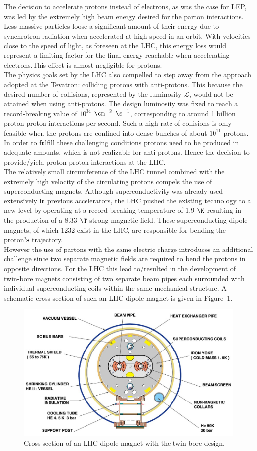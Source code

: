 The decision to accelerate protons instead of electrons, as was the case for LEP, was led by the extremely high beam energy desired for the parton interactions. Less massive particles loose a significant amount of their energy due to synchrotron radiation when accelerated at high speed in an orbit. With velocities close to the speed of light, as foreseen at the LHC, this energy loss would represent a limiting factor for the final energy reachable when accelerating electrons.This effect is almost negligible for protons.
\\
The physics goals set by the LHC also compelled to step away from the approach adopted at the Tevatron: colliding protons with anti-protons. This because the desired number of collisions, represented by the luminosity $\mathcal{L}$, would not be attained when using anti-protons. The design luminosity was fixed to reach a record-breaking value of $10^{34}$ $\cm^{-2}$ $\s^{-1}$, corresponding to around 1 billion proton-proton interactions per second. Such a high rate of collisions is only feasible when the protons are confined into dense bunches of about $10^{11}$ protons.
In order to fulfill these challenging conditions protons need to be produced in adequate amounts, which is not realizable for anti-protons. 
Hence the decision to provide/yield proton-proton interactions at the LHC.
\\
The relatively small circumference of the LHC tunnel combined with the extremely high velocity of the circulating protons compels the use of superconducting magnets. Although superconductivity was already used extensively in previous accelerators, the LHC pushed the existing technology to a new level by operating at a record-breaking temperature of 1.9 $\K$ resulting in the production of a 8.33 $\T$ strong magnetic field. 
These superconducting dipole magnets, of which 1232 exist in the LHC, are responsible for bending the proton\textbf{'s} trajectory.
\\
However the use of partons with the same electric charge introduces an additional challenge since two separate magnetic fields are required to bend the protons in opposite directions. For the LHC this lead to/resulted in the development of twin-bore magnets consisting of two separate beam pipes each surrounded with individual superconducting coils within the same mechanical structure.
A schematic cross-section of such an LHC dipole magnet is given in Figure~\ref{fig::LHCDipole}.
\begin{figure}[h!t]
 \centering
 \includegraphics[width = 0.6 \textwidth]{Chapters/Chapter2_CERN/Figures/lhc-pho-1998-341.jpg}
 \caption{Cross-section of an LHC dipole magnet with the twin-bore design.}%
 \label{fig::LHCDipole}
\end{figure}

